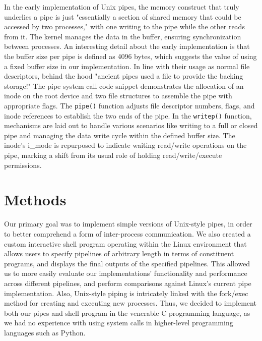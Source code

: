 In the early implementation of Unix pipes, the memory construct that truly underlies a pipe is just "essentially a section of shared memory that could be accessed by two processes,"\cite{menonSen} with one writing to the pipe while the other reads from it. The kernel manages the data in the buffer, ensuring synchronization between processes. An interesting detail about the early implementation is that the buffer size per pipe is defined as 4096 bytes, which suggests the value of using a fixed buffer size in our implementation. In line with their usage as normal file descriptors, behind the hood "ancient pipes used a file to provide the backing storage!"\cite{menonSen} The pipe system call code snippet demonstrates the allocation of an inode on the root device and two file structures to assemble the pipe with appropriate flags. The \texttt{pipe()} function adjusts file descriptor numbers, flags, and inode references to establish the two ends of the pipe. In the \texttt{writep()} function, mechanisms are laid out to handle various scenarios like writing to a full or closed pipe and managing the data write cycle within the defined buffer size. The inode's i\_mode is repurposed to indicate waiting read/write operations on the pipe, marking a shift from its usual role of holding read/write/execute permissions.\cite{menonSen}

\section{Methods}

Our primary goal was to implement simple versions of Unix-style pipes, in order to better comprehend a form of inter-process communication. We also created a custom interactive shell program operating within the Linux environment that allows users to specify pipelines of arbitrary length in terms of constituent programs, and displays the final outputs of the specified pipelines. This allowed us to more easily evaluate our implementations' functionality and performance across different pipelines, and perform comparisons against Linux's current pipe implementation. Also, Unix-style piping is intricately linked with the fork/exec method for creating and executing new processes. Thus, we decided to implement both our pipes and shell program in the venerable C programming language, as we had no experience with using system calls in higher-level programming languages such as Python.

